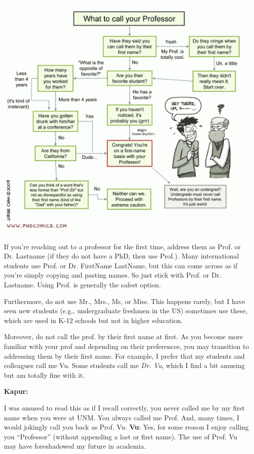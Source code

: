 \documentclass[oneside,11pt,dvipsnames]{book}
\newenvironment{commentbox}[1][]{
  \small
  \begin{mybox}
    {\small \textbf{#1}}
  }{
  \end{mybox}
}
\begin{document}
\begin{center}
  \includegraphics[scale=0.5]{files/c5.png}
\end{center}

If you're reaching out to a professor for the first time,  address them as Prof. or Dr. Lastname (if they do not have a PhD, then use Prof.). Many international students use Prof. or Dr. FirstName LastName, but this can come across as if you're simply copying and pasting names. So just stick with Prof. or Dr. Lastname.  Using Prof. is generally the safest option.

Furthermore, do not use Mr., Mrs., Ms, or Miss. This happens rarely, but I have seen  new students (e.g., undergraduate freshmen in the US) sometimes use these, which are used in K-12 schools but not in higher education.

Moreover, do not call the prof. by their first name at first.  As you become more familiar with your prof and depending on their preferences, you may transition to addressing them by their first name.
For example, I prefer that my students and colleagues call me Vu. Some students call me \emph{Dr. Vu}, which I find a bit amusing but am totally fine with it.

\begin{commentbox}[Kapur:]
  I was amused to read this as if I recall correctly, you never called me by my first name when you were at UNM. You always called me Prof. And, many times, I would jokingly call you back as Prof. Vu.
  \tcblower
  \textbf{Vu}: Yes, for some reason I enjoy calling you ``Professor'' (without appending a last or first name).  The use of Prof. Vu may have foreshadowed my future in academia.
\end{commentbox}
\end{document}
